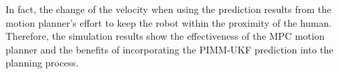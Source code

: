 \documentclass[journal]{IEEEtran}
\begin{document}
	In fact, the change of the velocity when using the prediction results from the motion planner's effort to keep the robot within the proximity of the human.
	Therefore, the simulation results show the effectiveness of the MPC motion planner and the benefits of incorporating the PIMM-UKF prediction into the planning process.
	
\end{document}
